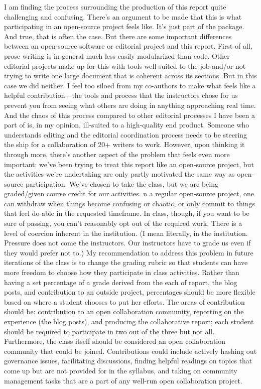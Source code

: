 I am finding the process surrounding the production of this report quite challenging and confusing. 
There's an argument to be made that this is what participating in an open-source project feels like. 
It's just part of the package. And true, that is often the case. But there are some important
differences between an open-source software or editorial project and this report.
First of all, prose writing is in general much less easily modularized than code. 
Other editorial projects make up for this with tools well suited to the job and/or
not trying to write one large document that is coherent across its sections. But in this 
case we did neither. I feel too siloed from my co-authors to make what feels like a helpful 
contribution---the tools and process that the instructors chose for us prevent you from seeing what others 
are doing in anything approaching real time. And the chaos of this process compared to other editorial processes I have 
been a part of is, in my opinion, ill-suited to a high-quality end product. Someone who 
understands editing and the editorial coordination process needs to be steering the ship for 
a collaboration of 20+ writers to work. However, upon thinking it through more, there's another aspect of the problem that 
feels even more important: we've been trying to treat this report like an open-source project, 
but the activities we're undertaking are only partly motivated the same way as open-source 
participation. We've chosen to take the class, but we are being graded/given course credit 
for our activities. n a regular open-source project, one can withdraw when things become 
confusing or chaotic, or only commit to things that feel do-able in the requested timeframe. 
In class, though, if you want to be sure of passing, you can't reasonably opt out of the 
required work. There is a level of coercion inherent in the institution. (I mean literally, 
in the institution. Pressure does not come the instructors. Our instructors have to grade 
us even if they would prefer not to.) My recommendation to address this problem in future 
iterations of the class is to change the grading rubric so that students can have more freedom 
to choose how they participate in class activities. Rather than having a set percentage of 
a grade derived from the each of report, the blog posts, and contribution to an outside project, 
percentages should be more flexible based on where a student chooses to put her efforts. 
The areas of contribution should be: contribution to an open collaboration community, reporting on 
the experience (the blog posts), and producing the collaborative report; each student should be 
required to participate in two out of the three but not all. Furthermore, the class itself 
should be considered an open collaboration community that could be joined. Contributions 
could include actively hashing out governance issues, facilitating discussions, finding 
helpful readings on topics that come up but are not provided for in the syllabus, and taking on 
community management tasks that are a part of any well-run open collaboration project. 

